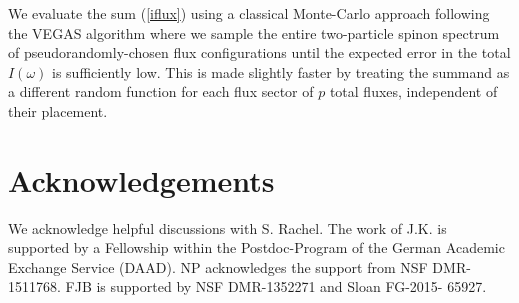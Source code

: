 \documentclass[reprint,amsmath,amssymb,aps,prb,groupedaddress,nofootinbib,superscriptaddress]{revtex4-1}
\newcommand{\1}{\mathds{1}}
\begin{document}
We evaluate the sum (\ref{iflux}) using a classical Monte-Carlo approach following the VEGAS algorithm where we sample the entire two-particle spinon spectrum of pseudorandomly-chosen flux configurations until the expected error in the total $I(\omega)$ is sufficiently low. This is made slightly faster by treating the summand as a different random function for each flux sector of $p$ total fluxes, independent of their placement. %







\section*{Acknowledgements}
We acknowledge helpful discussions with S. Rachel. The work of J.K. is supported by a Fellowship within the Postdoc-Program of the German Academic Exchange Service (DAAD). NP acknowledges the support from NSF DMR-1511768. FJB is supported by NSF DMR-1352271 and Sloan FG-2015- 65927.


	
	
\end{document}
